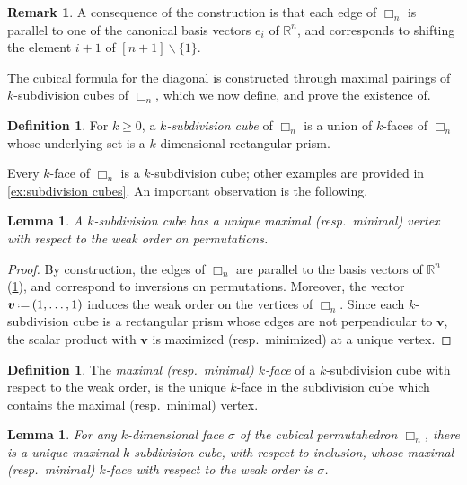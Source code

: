 \documentclass{amsart}
\newcommand{\darkblue}{\color{darkblue}} %
\newtheorem{lemma}[theorem]{Lemma}
\theoremstyle{definition}
\newtheorem{definition}[theorem]{Definition}
\newtheorem{remark}[theorem]{Remark}
\newcommand{\R}{\mathbb{R}} %
\renewcommand{\b}[1]{{\boldsymbol{#1}}} %
\newcommand{\ssm}{\smallsetminus} %
\newcommand{\eqdef}{\mbox{\,\raisebox{0.2ex}{\scriptsize\ensuremath{\mathrm:}}\ensuremath{=}\,}} %
\newcommand{\resp}{resp.~} %
\newcommand{\defn}[1]{\textsl{\darkblue #1}} %
\renewcommand{\b}[1]{\boldsymbol{#1}} %
\newcommand{\divcube}[1]{\Box_{#1}}
\begin{document}
\begin{remark}
	\label{rem:coordinates}
	A consequence of the construction is that each edge of $\divcube{n}$ is parallel to one of the canonical basis vectors $e_i$ of $\R^n$, and corresponds to shifting the element $i+1$ of $[n+1]\ssm \{1\}$.
\end{remark}

The cubical formula for the diagonal is constructed through maximal pairings of $k$-subdivision cubes of $\divcube{n}$, which we now define, and prove the existence of.

\begin{definition} 
\label{def:Subdivisions}
For $k\geq 0$, a \defn{$k$-subdivision cube} of $\divcube{n}$ is a union of $k$-faces of $\divcube{n}$ whose underlying set is a $k$-dimensional rectangular prism.
\end{definition}

Every $k$-face of $\divcube{n}$ is a $k$-subdivision cube; other examples are provided in \cref{ex:subdivision cubes}.
An important observation is the following. 

\begin{lemma}
\label{lem:k-subdiv cubes have max/min k faces}
A $k$-subdivision cube has a unique maximal (\resp minimal) vertex with respect to the weak order on permutations.
\end{lemma}

\begin{proof}
	By construction, the edges of $\divcube{n}$ are parallel to the basis vectors of $\R^n$ (\cref{rem:coordinates}), and correspond to inversions on permutations. 
	Moreover, the vector $\b{v}\eqdef(1,\ldots,1)$ induces the weak order on the vertices of $\divcube{n}$.  
	Since each $k$-subdivision cube is a rectangular prism whose edges are not perpendicular to $\b{v}$, the scalar product with $\b{v}$ is maximized (\resp minimized) at a unique vertex. 
\end{proof}

\begin{definition}
	The \defn{maximal (\resp minimal) $k$-face} of a $k$-subdivision cube with respect to the weak order, is the unique $k$-face in the subdivision cube which contains the maximal (\resp minimal) vertex.
\end{definition}

\begin{lemma}
\label{lem:Unique maximal subdivcubes}
For any $k$-dimensional face $\sigma$ of the cubical permutahedron $\divcube{n}$, there is a unique maximal $k$-subdivision cube, with respect to inclusion, whose maximal (\resp minimal) $k$-face with respect to the weak order is $\sigma$.
\end{lemma}
\end{document}
